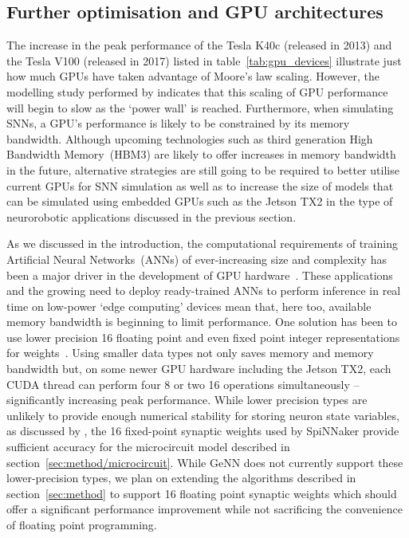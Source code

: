 \documentclass[utf8]{frontiersSCNS} %
\begin{document}
\subsection{Further optimisation and GPU architectures}
The increase in the peak performance of the Tesla K40c (released in 2013) and the Tesla V100 (released in 2017) listed in table~\ref{tab:gpu_devices} illustrate just how much GPUs have taken advantage of Moore's law scaling.
However, the modelling study performed by \citet{Esmaeilzadeh2012} indicates that this scaling of GPU performance will begin to slow as the `power wall' is reached.
Furthermore, when simulating SNNs, a GPU's performance is likely to be constrained by its memory bandwidth.
Although upcoming technologies such as third generation High Bandwidth Memory~(HBM3) are likely to offer increases in memory bandwidth in the future, alternative strategies are still going to be required to better utilise current GPUs for SNN simulation as well as to increase the size of models that can be simulated using embedded GPUs such as the Jetson TX2 in the type of neurorobotic applications discussed in the previous section.

As we discussed in the introduction, the computational requirements of training Artificial Neural Networks~(ANNs) of ever-increasing size and complexity has been a major driver in the development of GPU hardware~\citep{Schmidhuber2015}.
These applications and the growing need to deploy ready-trained ANNs to perform inference in real time on low-power `edge computing' devices mean that, here too, available memory bandwidth is beginning to limit performance.
One solution has been to use lower precision \SI{16}{\bit} floating point and even fixed point integer representations for weights~\citep{Micikevicius2017}.
Using smaller data types not only saves memory and memory bandwidth but, on some newer GPU hardware including the Jetson TX2, each CUDA thread can perform four \SI{8}{\bit} or two \SI{16}{\bit} operations simultaneously -- significantly increasing peak performance.
While lower precision types are unlikely to provide enough numerical stability for storing neuron state variables, as discussed by \citet{VanAlbada2018}, the \SI{16}{\bit} fixed-point synaptic weights used by SpiNNaker provide sufficient accuracy for the microcircuit model described in section~\ref{sec:method/microcircuit}.
While GeNN does not currently support these lower-precision types, we plan on extending the algorithms described in section~\ref{sec:method} to support \SI{16}{\bit} floating point synaptic weights which should offer a significant performance improvement while not sacrificing the convenience of floating point programming.
\end{document}
